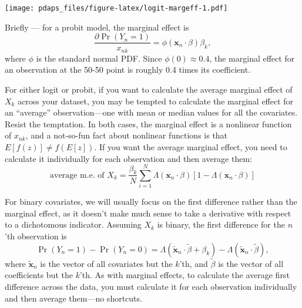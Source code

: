 \documentclass[12pt,oneside,openany]{book}
\begin{document}
\texttt{[image: pdaps\_files/figure-latex/logit-margeff-1.pdf]}

Briefly --- for a probit model, the marginal effect is \[
\frac{\partial \Pr(Y_n = 1)}{x_{nk}} = \phi(\mathbf{x}_n \cdot \beta) \beta_k,
\] where \(\phi\) is the standard normal PDF. Since
\(\phi(0) \approx 0.4\), the marginal effect for an observation at the
50-50 point is roughly 0.4 times its coefficient.

For either logit or probit, if you want to calculate the average
marginal effect of \(X_k\) across your dataset, you may be tempted to
calculate the marginal effect for an ``average'' observation---one with
mean or median values for all the covariates. Resist the temptation. In
both cases, the marginal effect is a nonlinear function of \(x_{nk}\),
and a not-so-fun fact about nonlinear functions is that
\(E[f(z)] \neq f(E[z])\). If you want the average marginal effect, you
need to calculate it individually for each observation and then average
them: \[
\text{average m.e. of $X_k$}
= \frac{\beta_k}{N} \sum_{i=1}^N \Lambda(\mathbf{x}_n \cdot \beta) [1 - \Lambda(\mathbf{x}_n \cdot \beta)]
\]

For binary covariates, we will usually focus on the first difference
rather than the marginal effect, as it doesn't make much sense to take a
derivative with respect to a dichotomous indicator. Assuming \(X_k\) is
binary, the first difference for the \(n\)'th observation is \[
\Pr(Y_n = 1) - \Pr(Y_n = 0) =
\Lambda(\tilde{\mathbf{x}}_n \cdot \tilde{\beta} + \beta_k)
- \Lambda(\tilde{\mathbf{x}}_n \cdot \tilde{\beta}),
\] where \(\tilde{\mathbf{x}}_n\) is the vector of all covariates but
the \(k\)'th, and \(\tilde{\beta}\) is the vector of all coefficients
but the \(k\)'th. As with marginal effects, to calculate the average
first difference across the data, you must calculate it for each
observation individually and then average them---no shortcuts.


\end{document}
